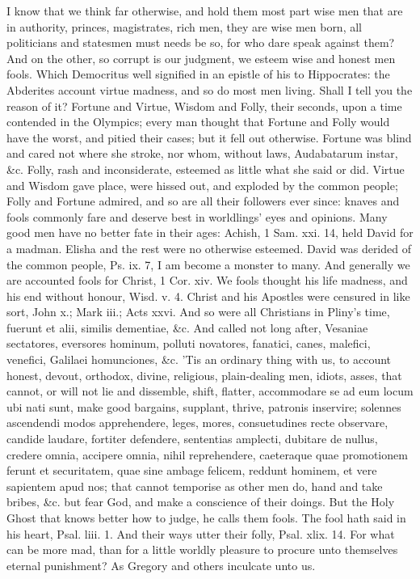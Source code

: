 {I know that we think far otherwise, and hold them most part wise men
that are in authority, princes, magistrates, rich men, they are
wise men born, all politicians and statesmen must needs be so, for who
dare speak against them? And on the other, so corrupt is our judgment,
we esteem wise and honest men fools. Which Democritus well signified in
an epistle of his to Hippocrates: the Abderites account virtue
madness, and so do most men living. Shall I tell you the reason of it?
Fortune and Virtue, Wisdom and Folly, their seconds, upon a time
contended in the Olympics; every man thought that Fortune and Folly
would have the worst, and pitied their cases; but it fell out
otherwise. Fortune was blind and cared not where she stroke, nor whom,
without laws, Audabatarum instar, \&c. Folly, rash and inconsiderate,
esteemed as little what she said or did. Virtue and Wisdom gave
place, were hissed out, and exploded by the common people; Folly
and Fortune admired, and so are all their followers ever since: knaves
and fools commonly fare and deserve best in worldlings' eyes and
opinions. Many good men have no better fate in their ages: Achish, 1
Sam. xxi. 14, held David for a madman. Elisha and the rest were no
otherwise esteemed. David was derided of the common people, Ps. ix. 7,
I am become a monster to many. And generally we are accounted fools for
Christ, 1 Cor. xiv. We fools thought his life madness, and his end
without honour, Wisd. v. 4. Christ and his Apostles were censured in
like sort, John x.; Mark iii.; Acts xxvi. And so were all Christians in
Pliny's time, fuerunt et alii, similis dementiae, \&c. And called
not long after, Vesaniae sectatores, eversores hominum, polluti
novatores, fanatici, canes, malefici, venefici, Galilaei homunciones,
\&c. 'Tis an ordinary thing with us, to account honest, devout,
orthodox, divine, religious, plain-dealing men, idiots, asses, that
cannot, or will not lie and dissemble, shift, flatter, accommodare se
ad eum locum ubi nati sunt, make good bargains, supplant, thrive,
patronis inservire; solennes ascendendi modos apprehendere, leges,
mores, consuetudines recte observare, candide laudare, fortiter
defendere, sententias amplecti, dubitare de nullus, credere omnia,
accipere omnia, nihil reprehendere, caeteraque quae promotionem ferunt
et securitatem, quae sine ambage felicem, reddunt hominem, et vere
sapientem apud nos; that cannot temporise as other men do, hand
and take bribes, \&c. but fear God, and make a conscience of their
doings. But the Holy Ghost that knows better how to judge, he calls
them fools. The fool hath said in his heart, Psal. liii. 1. And their
ways utter their folly, Psal. xlix. 14. For what can be more mad,
than for a little worldly pleasure to procure unto themselves eternal
punishment? As Gregory and others inculcate unto us.

}
